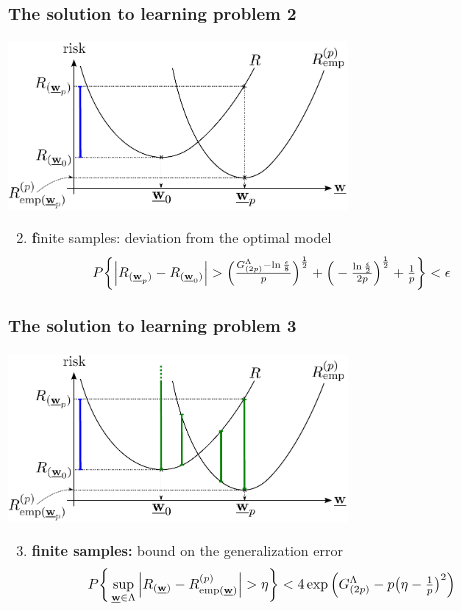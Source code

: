 \begin{frame}\frametitle{The solution to learning problem 2} 
	\begin{center}
		\includegraphics[width=9cm]{img/section2_fig1_question1}
	\end{center}
	\begin{enumerate}\setcounter{enumi}{1}
		\item {\textbf finite samples:} deviation from the optimal model
			\vspace{-2mm}
			\begin{equation}
				P\bigg\{ {%
				\Big| R_{(\vec w_p)} - R_{(\vec w_0)} \Big| }
					> \Big(\smallfrac{G^\Lambda_{(2p)} 
						- \ln \frac{\epsilon}{8}}{p} \Big)^\frac{1}{2}
					+ \Big(-\smallfrac{\ln \frac{\epsilon}{2}}{2p} 
						\Big)^\frac{1}{2} + \smallfrac{1}{p}
				\bigg\} < \epsilon
					\label{eq:boundgenerlizationdeviation}
			\end{equation}
			\vspace{-4mm}
	\end{enumerate}
\end{frame}

\begin{frame}\frametitle{The solution to learning problem 3} 
	\begin{center}
		\includegraphics[width=9cm]{img/section2_fig1_question2_lessw}
	\end{center}
	\begin{enumerate}\setcounter{enumi}{2}
		\item \textbf{finite samples:} bound on the generalization error
			\vspace{-2mm}
			\begin{equation}
				P\bigg\{ \sup\limits_{\vec w \in \Lambda}
					{%
						\Big|R_{(\vec w)} - R^{(p)}_{\text{emp}(\vec w)}\Big| 
					} > \eta
				\bigg\} < 4 \exp\Big( G^\Lambda_{(2p)} 
					- p \big( \eta - \smallfrac{1}{p} \big)^2 \Big)
					\label{eq:boundgenerlization}
			\end{equation}
			\vspace{-4mm}
	\end{enumerate}
\end{frame}
